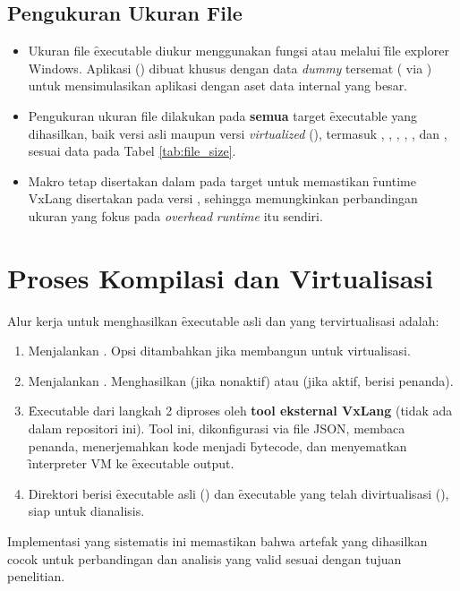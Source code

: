 \subsection{Pengukuran Ukuran File}
\begin{itemize}
    \item {} Ukuran file \f{executable} diukur menggunakan fungsi  atau melalui \f{file explorer} Windows. Aplikasi  () dibuat khusus dengan data \textit{dummy} tersemat ( via ) untuk mensimulasikan aplikasi dengan aset data internal yang besar.
    \item {} Pengukuran ukuran file dilakukan pada \textbf{semua} target \f{executable} yang dihasilkan, baik versi asli maupun versi \textit{virtualized} (), termasuk , , , , , dan , sesuai data pada Tabel \ref{tab:file_size}.
    \item {} Makro  tetap disertakan dalam  pada target  untuk memastikan \f{runtime} VxLang disertakan pada versi , sehingga memungkinkan perbandingan ukuran yang fokus pada \textit{overhead} \textit{runtime} itu sendiri.
\end{itemize}

\section{Proses Kompilasi dan Virtualisasi}
Alur kerja untuk menghasilkan \f{executable} asli dan yang tervirtualisasi adalah:

\begin{enumerate}
    \item {} Menjalankan . Opsi  ditambahkan jika membangun untuk virtualisasi.
    \item {} Menjalankan . Menghasilkan  (jika  nonaktif) atau  (jika  aktif, berisi penanda).
    \item {} \f{Executable}  dari langkah 2 diproses oleh \textbf{tool eksternal VxLang} (tidak ada dalam repositori ini). Tool ini, dikonfigurasi via file JSON, membaca penanda, menerjemahkan kode menjadi \f{bytecode}, dan menyematkan \f{interpreter} VM ke \f{executable} output.
    \item {} Direktori  berisi \f{executable} asli () dan \f{executable} yang telah divirtualisasi (), siap untuk dianalisis.
\end{enumerate}

Implementasi yang sistematis ini memastikan bahwa artefak yang dihasilkan cocok untuk perbandingan dan analisis yang valid sesuai dengan tujuan penelitian.
